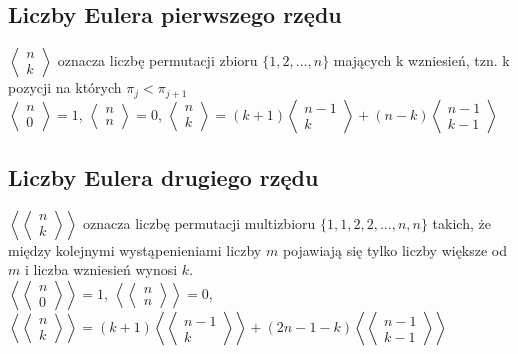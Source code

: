 \documentclass[a4paper,12pt]{article}
\begin{document}
\subsection{Liczby Eulera pierwszego rzędu}
$\left<  \begin{matrix} n \\ k\end{matrix} \right>$ oznacza liczbę permutacji zbioru $\{1,2,\dots, n\}$ mających k wzniesień, tzn. k pozycji na których $\pi_j<\pi_{j+1}$\\
$\left<  \begin{matrix} n \\ 0\end{matrix} \right>=1$,
$\left<  \begin{matrix} n \\ n\end{matrix} \right>=0$,
$\left<  \begin{matrix} n \\ k\end{matrix} \right>=(k+1)\left<  \begin{matrix} n-1 \\ k\end{matrix} \right> +(n-k) \left<  \begin{matrix} n-1 \\ k-1\end{matrix} \right>$ \\
\subsection{Liczby Eulera drugiego rzędu}
$\left<\left<  \begin{matrix} n \\ k\end{matrix} \right>\right>$ oznacza liczbę permutacji multizbioru $\{1,1,2,2,\dots,n,n\}$ takich, że między kolejnymi wystąpenieniami liczby $m$ pojawiają się tylko liczby większe od $m$ i liczba wzniesień wynosi $k$.\\
$\left<\left<  \begin{matrix} n \\ 0\end{matrix} \right>\right>=1$,
$\left<\left<  \begin{matrix} n \\ n\end{matrix} \right>\right>=0$,
$\left<\left<  \begin{matrix} n \\ k\end{matrix} \right>\right>=(k+1)\left<\left<  \begin{matrix} n-1 \\ k\end{matrix} \right>\right> +(2n-1-k) \left<\left<  \begin{matrix} n-1 \\ k-1\end{matrix} \right>\right>$ \\
\end{document}
